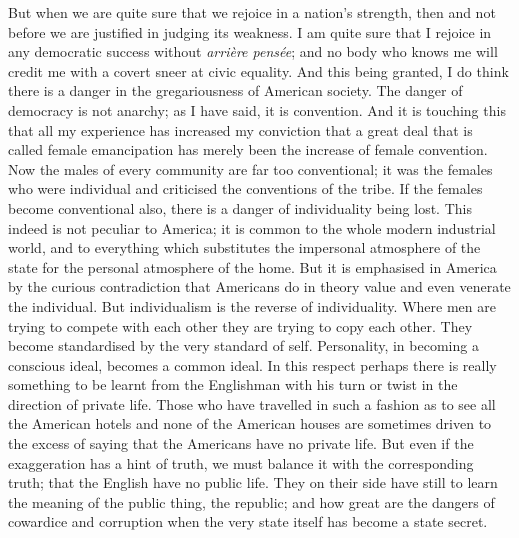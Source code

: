 \documentclass{book}
\begin{document}
But when we are quite sure that we rejoice in a nation’s strength, then and not before we are justified in judging its weakness. I am quite sure that I rejoice in any democratic success without \emph{arrière pensée}; and no body who knows me will credit me with a covert sneer at civic equality. And this being granted, I do think there is a danger in the gregariousness of American society. The danger of democracy is not anarchy; as I have said, it is convention. And it is touching this that all my experience has increased my conviction that a great deal that is called female emancipation has merely been the increase of female convention. Now the males of every community are far too conventional; it was the females who were individual and criticised the conventions of the tribe. If the females become conventional also, there is a danger of individuality being lost. This indeed is not peculiar to America; it is common to the whole modern industrial world, and to everything which substitutes the impersonal atmosphere of the state for the personal atmosphere of the home. But it is emphasised in America by the curious contradiction that Americans do in theory value and even venerate the individual. But individualism is the reverse of individuality. Where men are trying to compete with each other they are trying to copy each other. They become standardised by the very standard of self. Personality, in becoming a conscious ideal, becomes a common ideal. In this respect perhaps there is really something to be learnt from the Englishman with his turn or twist in the direction of private life. Those who have travelled in such a fashion as to see all the American hotels and none of the American houses are sometimes driven to the excess of saying that the Americans have no private life. But even if the exaggeration has a hint of truth, we must balance it with the corresponding truth; that the English have no public life. They on their side have still to learn the meaning of the public thing, the republic; and how great are the dangers of cowardice and corruption when the very state itself has become a state secret.
\end{document}

